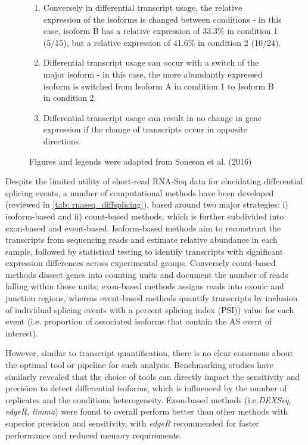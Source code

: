 \begin{figure}[htp]
{\begin{enumerate}[label=\textbf{\Alph*})]
		\item Conversely in differential transcript usage, the relative expression of the isoforms is changed between conditions - in this case, isoform B has a relative expression of 33.3\% in condition 1 (5/15), but a relative expression of 41.6\% in condition 2 (10/24).
		\item Differential transcript usage can occur with a switch of the major isoform - in this case, the more abundantly expressed isoform is switched from Isoform A in condition 1 to Isoform B in condition 2. 
		\item Differential transcript usage can result in no change in gene expression if the change of transcripts occur in opposite directions.
		\\
	\end{enumerate} 
	Figures and legends were adapted from Soneson et al. (2016)\cite{Soneson2016} 
   }
	\label{fig:dte_dtu_explanation}
\end{figure}


Despite the limited utility of short-read RNA-Seq data for elucidating differential splicing events, a number of computational methods have been developed (reviewed in \cref{tab: rnaseq_diffsplicing}), based around two major strategies: i) isoform-based and ii) count-based methods, which is further subdivided into exon-based and event-based. Isoform-based methods aim to reconstruct the transcripts from sequencing reads and estimate relative abundance in each sample, followed by statistical testing to identify transcripts with significant expression differences across experimental groups\cite{Mehmood2020}. Conversely count-based methods dissect genes into counting units and document the number of reads falling within those units\cite{Mehmood2020}; exon-based methods assigns reads into exonic and junction regions, whereas event-based methods quantify transcripts by inclusion of individual splicing events with a percent splicing index (PSI)) value for each event (i.e. proportion of associated isoforms that contain the AS event of interest). 

However, similar to transcript quantification, there is no clear consensus about the optimal tool or pipeline for such analysis. Benchmarking studies have similarly revealed that the choice of tools can directly impact the sensitivity and precision to detect differential isoforms, which is influenced by the number of replicates and the conditions heterogeneity\cite{Merino2019}. Exon-based methods (i.e.\textit{DEXSeq, edgeR, limma}) were found to overall perform better than other methods with superior precision and sensitivity, with \textit{edgeR} recommended for faster performance and reduced memory requirements\cite{Mehmood2020}. 


